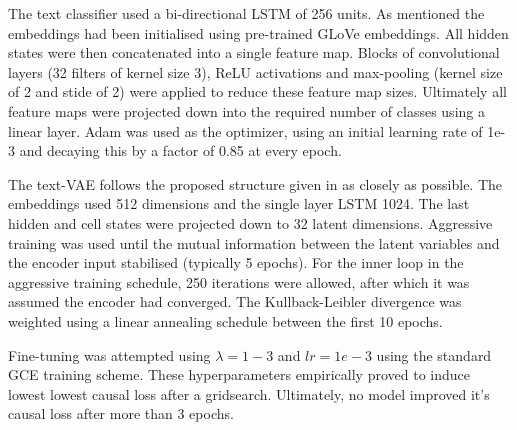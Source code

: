 The text classifier used a bi-directional LSTM of 256 units. As mentioned the embeddings had been initialised using pre-trained GLoVe embeddings. All hidden states were then concatenated into a single feature map. Blocks of convolutional layers (32 filters of kernel size 3), ReLU activations and max-pooling (kernel size of 2 and stide of 2) were applied to reduce these feature map sizes. Ultimately all feature maps were projected down into the required number of classes using a linear layer. Adam was used as the optimizer, using an initial learning rate of 1e-3 and decaying this by a factor of 0.85 at every epoch.

The text-VAE follows the proposed structure given in \cite{he2019lagging} as closely as possible. The embeddings used 512 dimensions and the single layer LSTM 1024. The last hidden and cell states were projected down to 32 latent dimensions. Aggressive training was used until the mutual information between the latent variables and the encoder input stabilised (typically 5 epochs). For the inner loop in the aggressive training schedule, 250 iterations were allowed, after which it was assumed the encoder had converged. The Kullback-Leibler divergence was weighted using a linear annealing schedule between the first 10 epochs. 

Fine-tuning was attempted using $\lambda=1-3$ and $lr=1e-3$ using the standard GCE training scheme. These hyperparameters empirically proved to induce lowest lowest causal loss after a gridsearch. Ultimately, no model improved it's causal loss after more than 3 epochs.

